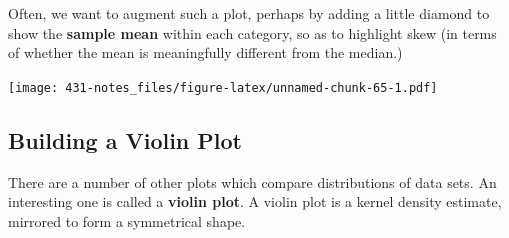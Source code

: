 \documentclass[
]{book}
\newenvironment{Shaded}{\begin{snugshade}}{\end{snugshade}}
\newcommand{\DataTypeTok}[1]{\textcolor[rgb]{0.13,0.29,0.53}{#1}}
\newcommand{\DecValTok}[1]{\textcolor[rgb]{0.00,0.00,0.81}{#1}}
\newcommand{\KeywordTok}[1]{\textcolor[rgb]{0.13,0.29,0.53}{\textbf{#1}}}
\newcommand{\NormalTok}[1]{#1}
\newcommand{\OperatorTok}[1]{\textcolor[rgb]{0.81,0.36,0.00}{\textbf{#1}}}
\newcommand{\OtherTok}[1]{\textcolor[rgb]{0.56,0.35,0.01}{#1}}
\newcommand{\StringTok}[1]{\textcolor[rgb]{0.31,0.60,0.02}{#1}}
\begin{document}
Often, we want to augment such a plot, perhaps by adding a little diamond to show the \textbf{sample mean} within each category, so as to highlight skew (in terms of whether the mean is meaningfully different from the median.)

\begin{Shaded}
\end{Shaded}

\texttt{[image: 431-notes\_files/figure-latex/unnamed-chunk-65-1.pdf]}

\hypertarget{building-a-violin-plot}{%
\subsection{Building a Violin Plot}\label{building-a-violin-plot}}

There are a number of other plots which compare distributions of data sets. An interesting one is called a \textbf{violin plot}. A violin plot is a kernel density estimate, mirrored to form a symmetrical shape.
\end{document}
